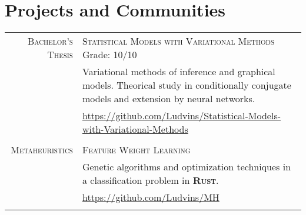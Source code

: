 \documentclass[a4paper,10pt]{article} %
\begin{document}
{%

\section{Projects and Communities}
\begin{tabular}{r|p{11cm}}
  \textsc{Bachelor's Thesis} & \textsc{Statistical Models with Variational Methods} \hfill Grade: 10/10 \\
  \footnotesize &  \footnotesize Variational methods of inference and graphical models. Theorical study in conditionally conjugate models and extension by neural networks.\\
                             & \footnotesize \url{https://github.com/Ludvins/Statistical-Models-with-Variational-Methods}\\
  \multicolumn{2}{c}{} \\


  \textsc{Metaheuristics} & \textsc{Feature Weight Learning} \\
                             & \footnotesize Genetic algorithms and optimization techniques in a classification problem in \textbf{\textsc{Rust}}.\\
                             & \footnotesize \url{https://github.com/Ludvins/MH}\\
  \multicolumn{2}{c}{} \\


\end{tabular}}
\end{document}
